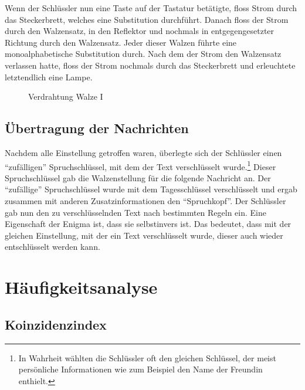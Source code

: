 \documentclass[ngerman, a4paper, footsepline, headsepline]{scrreport}
\begin{document}
		
	Wenn der Schlüssler nun eine Taste auf der Tastatur betätigte, floss Strom durch das Steckerbrett, welches eine Substitution durchführt. Danach floss der Strom durch den Walzensatz, in den Reflektor und nochmals in entgegengesetzter Richtung durch den Walzensatz. Jeder dieser Walzen führte eine monoalphabetische Substitution durch. Nach dem der Strom den Walzensatz verlassen hatte, floss der Strom nochmals durch das Steckerbrett und erleuchtete letztendlich eine Lampe.
	\begin{figure}[htbp]
		\centering
		\caption{Verdrahtung Walze I}
		\label{fig:rot1_cabeling}
	\end{figure}
	
	
	
	
	\section{Übertragung der Nachrichten}
	Nachdem alle Einstellung getroffen waren, überlegte sich der Schlüssler einen "`zufälligen"' Spruchschlüssel, mit dem der Text verschlüsselt wurde.\footnote{In Wahrheit wählten die Schlüssler oft den gleichen Schlüssel, der meist persönliche Informationen wie zum Beispiel den Name der Freundin enthielt.} Dieser Spruchschlüssel gab die Walzenstellung für die folgende Nachricht an. Der "`zufällige"' Spruchschlüssel wurde mit dem Tagesschlüssel verschlüsselt und ergab zusammen mit anderen Zusatzinformationen den "`Spruchkopf"'. Der Schlüssler gab nun den zu verschlüsselnden Text nach bestimmten Regeln ein. Eine Eigenschaft der Enigma ist, dass sie selbstinvers ist. Das bedeutet, dass mit der gleichen Einstellung, mit der ein Text verschlüsselt wurde, dieser auch wieder entschlüsselt werden kann.
	
	
	\chapter{Häufigkeitsanalyse}
	\section{Koinzidenzindex}
	\thispagestyle{scrheadings}
	
\end{document}
